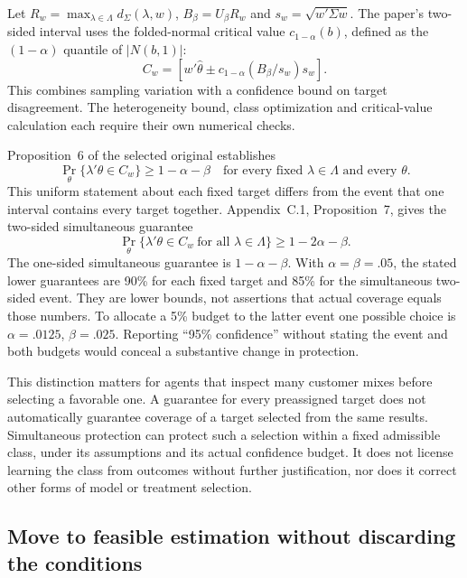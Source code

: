 Let $R_w=\max_{\lambda\in\Lambda}d_\Sigma(\lambda,w)$,
$B_\beta=U_\beta R_w$ and $s_w=\sqrt{w'\Sigma w}$. The paper's two-sided
interval uses the folded-normal critical value $c_{1-\alpha}(b)$, defined as
the $(1-\alpha)$ quantile of $|N(b,1)|$:
\begin{equation}
 C_w=\left[ w'\widehat\theta
       \mathbin{\pm}c_{1-\alpha}(B_\beta/s_w)s_w\right].
 \label{exec22:targets-ci}
\end{equation}
This combines sampling variation with a confidence bound on target
disagreement. The heterogeneity bound, class optimization and critical-value
calculation each require their own numerical checks.

Proposition~6 of the selected original establishes
\begin{equation}
 \Pr_\theta\{\lambda'\theta\in C_w\}\geq1-\alpha-\beta
 \quad\text{for every fixed }\lambda\in\Lambda\text{ and every }\theta.
 \label{exec22:targets-point}
\end{equation}
This uniform statement about each fixed target differs from the event that
one interval contains every target together. Appendix~C.1, Proposition~7,
gives the two-sided simultaneous guarantee
\begin{equation}
 \Pr_\theta\{\lambda'\theta\in C_w\ \text{for all }\lambda\in\Lambda\}
    \geq1-2\alpha-\beta.
 \label{exec22:targets-set}
\end{equation}
The one-sided simultaneous guarantee is $1-\alpha-\beta$. With
$\alpha=\beta=.05$, the stated lower guarantees are 90\% for each fixed
target and 85\% for the simultaneous two-sided event. They are lower bounds,
not assertions that actual coverage equals those numbers. To allocate a 5\%
budget to the latter event one possible choice is
$\alpha=.0125$, $\beta=.025$. Reporting ``95\% confidence'' without stating
the event and both budgets would conceal a substantive change in protection.

This distinction matters for agents that inspect many customer mixes before
selecting a favorable one. A guarantee for every preassigned target does not
automatically guarantee coverage of a target selected from the same results.
Simultaneous protection can protect such a selection within a fixed admissible
class, under its assumptions and its actual confidence budget. It does not
license learning the class from outcomes without further justification, nor
does it correct other forms of model or treatment selection.

\subsection{Move to feasible estimation without discarding the conditions}

